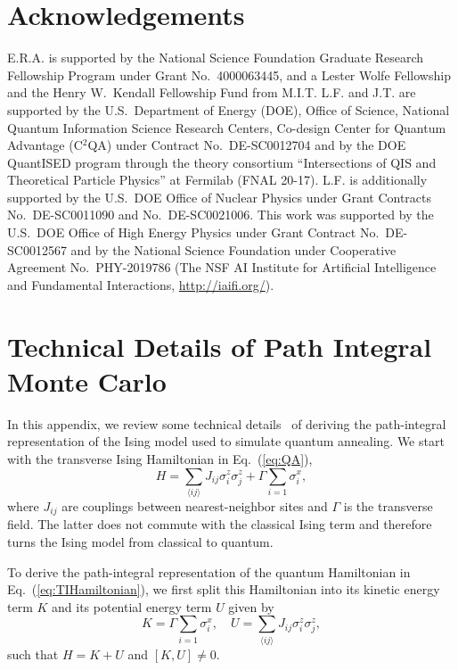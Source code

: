 \documentclass[aps,prd,twocolumn, superscriptaddress,preprintnumbers, nofootinbib,longbibliography,floatfix]{revtex4-2}
\DeclareRobustCommand{\Eq}[1]{Eq.~(\ref{#1})}
\begin{document}
\section*{Acknowledgements} 

E.R.A. is supported by the National Science Foundation Graduate Research Fellowship Program under Grant No.\ 4000063445, and a Lester Wolfe Fellowship and the Henry W.\ Kendall Fellowship Fund from M.I.T.
%
L.F. and J.T. are supported by the U.S.\ Department of Energy (DOE), Office of Science, National Quantum Information Science Research Centers, Co-design Center for Quantum Advantage (C$^2$QA) under Contract No.\ DE-SC0012704 and by the DOE QuantISED program through the theory consortium “Intersections of QIS and Theoretical Particle Physics” at Fermilab (FNAL 20-17).
%
L.F. is additionally supported by the U.S.\ DOE Office of Nuclear Physics under Grant Contracts No.\ DE-SC0011090 and No.\ DE-SC0021006.
%
This work was supported by the U.S.\ DOE Office of High Energy Physics under Grant Contract No.\ DE-SC0012567 and by the National Science Foundation under Cooperative Agreement No.\ PHY-2019786 (The NSF AI Institute for Artificial Intelligence and Fundamental Interactions, \url{http://iaifi.org/}).




\appendix



\section{Technical Details of Path Integral Monte Carlo} 
\label{app:trotter}

In this appendix, we review some technical details~\cite{PhysRevB.66.094203} of deriving the path-integral representation of the Ising model used to simulate quantum annealing.
%
We start with the transverse Ising Hamiltonian in \Eq{eq:QA},
%
\begin{equation}
    H=\sum\limits_{\langle ij\rangle} J_{ij}\sigma_i^z\sigma_j^z+\Gamma\sum\limits_{i=1}\sigma_i^x,
    \label{eq:TIHamiltonian}
\end{equation}
%
where $J_{ij}$ are couplings between nearest-neighbor sites and $\Gamma$ is the transverse field. The latter does not commute with the classical Ising term and therefore turns the Ising model from classical to quantum.

To derive the path-integral representation of the quantum Hamiltonian in \Eq{eq:TIHamiltonian}, we first split this Hamiltonian into its kinetic energy term $K$ and its potential energy term $U$ given by
%
\begin{equation}
K=\Gamma\sum\limits_{i=1}\sigma_i^x,\quad U=\sum\limits_{\langle ij\rangle} J_{ij}\sigma_i^z\sigma_j^z,
\end{equation}
%
such that $H=K+U$ and $[K,U]\neq 0$.
\end{document}

